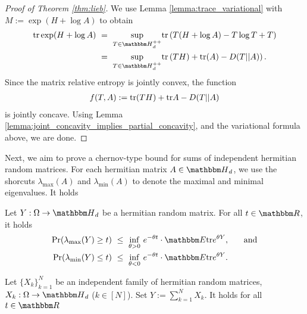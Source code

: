 \begin{proof}[Proof of Theorem \ref{thm:lieb}]
  We use Lemma \ref{lemma:trace_variational} with $M := \exp(H + \log A)$ to obtain
  \begin{align}
    \tr \exp (H + \log A) \
     & = \ \underset{T \in \bbmH_d^{++}}{\sup} \tr\left(T( H+ \log A) - T \log T + T \right) \\
     & = \ \underset{T \in \bbmH_d^{++}}{\sup} \tr\left(TH) + \tr(A) - D(T||A) \right).      \\
  \end{align}
  Since the matrix relative entropy is jointly convex, the function
  \begin{align}
    f(T,A) := \mathrm{tr}(TH) + \mathrm{tr} A - D(T||A)
  \end{align}
  is jointly concave. Using Lemma \ref{lemma:joint_concavity_implies_partial_concavity}, and the variational formula above, we are done.
\end{proof}

Next, we aim to prove a chernov-type bound for sums of independent hermitian random matrices. For each hermitian matrix $A \in \bbmH_d$, we use the shorcuts
$\lambda_{\max}(A)$ and $\lambda_{\min}(A)$ to denote the maximal and minimal eigenvalues. It holds
\begin{proposition}
  Let $Y: \Omega \rightarrow \bbmH_d$ be a hermitian random matrix. For all $t \in \bbmR$, it holds
  \begin{align}
    \prob(\lambda_{\max}(Y) \geq t) \  & \leq \ \underset{\theta > 0}{\inf} \ e^{-\theta t} \cdot  \bbmE \tr e^{\theta Y}, \ \hspace{.5cm} \text{and} \\
    \prob(\lambda_{\min}(Y) \leq t) \  & \leq \ \underset{\theta < 0}{\inf} \ e^{-\theta t} \cdot  \bbmE \tr e^{\theta Y}.
  \end{align}
\end{proposition}

\begin{theorem}
  Let $\{X_k\}_{k=1}^N$ be an independent family of hermitian random matrices, $X_k: \Omega \rightarrow \bbmH_d$ ($k \in [N]$). Set $Y := \sum_{k=1}^N X_k$.
  It holds for all $t \in \bbmR$


\end{theorem}


